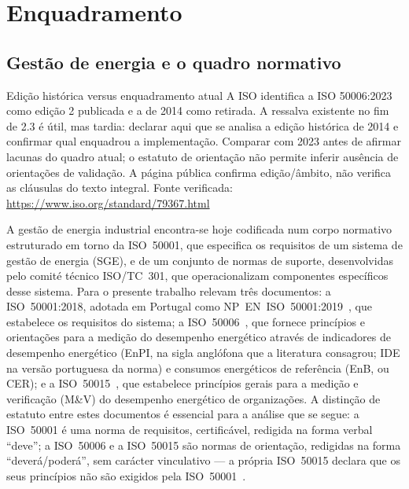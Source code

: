 
\chapter{Enquadramento}
\label{cha:enquadramento}

\section{Gestão de energia e o quadro normativo}
\label{sec:normas}
{Edição histórica versus enquadramento atual}
{A ISO identifica a ISO 50006:2023 como edição 2 publicada e a de 2014
como retirada. A ressalva existente no fim de 2.3 é útil, mas tardia:
declarar aqui que se analisa a edição histórica de 2014 e confirmar qual
enquadrou a implementação. Comparar com 2023 antes de afirmar lacunas do
quadro atual; o estatuto de orientação não permite inferir ausência de
orientações de validação. A página pública confirma edição/âmbito,
não verifica as cláusulas do texto integral.
Fonte verificada: \url{https://www.iso.org/standard/79367.html}}%

A gestão de energia industrial encontra-se hoje codificada num corpo normativo estruturado em torno da ISO~50001, que especifica os requisitos de um sistema de gestão de energia (SGE), e de um conjunto de normas de suporte, desenvolvidas pelo comité técnico ISO/TC~301, que operacionalizam componentes específicos desse sistema. Para o presente trabalho relevam três documentos: a ISO~50001:2018, adotada em Portugal como NP~EN~ISO~50001:2019~\cite{ISO50001_2018}, que estabelece os requisitos do sistema; a ISO~50006~\cite{ISO50006_2014}, que fornece princípios e orientações para a medição do desempenho energético através de indicadores de desempenho energético (EnPI, na sigla anglófona que a literatura consagrou; IDE na versão portuguesa da norma) e consumos energéticos de referência (EnB, ou CER); e a ISO~50015~\cite{ISO50015_2014}, que estabelece princípios gerais para a medição e verificação (M\&V) do desempenho energético de organizações. A distinção de estatuto entre estes documentos é essencial para a análise que se segue: a ISO~50001 é uma norma de requisitos, certificável, redigida na forma verbal \enquote{deve}; a ISO~50006 e a ISO~50015 são normas de orientação, redigidas na forma \enquote{deverá/poderá}, sem carácter vinculativo --- a própria ISO~50015 declara que os seus princípios não são exigidos pela ISO~50001~\cite[Introdução]{ISO50015_2014}.

